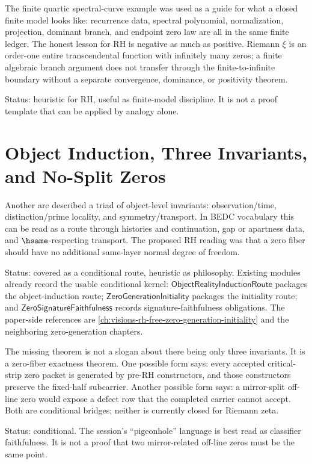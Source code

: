 The finite quartic spectral-curve example was used as a guide for what a
closed finite model looks like: recurrence data, spectral polynomial,
normalization, projection, dominant branch, and endpoint zero law are all in
the same finite ledger.  The honest lesson for RH is negative as much as
positive.  Riemann $\xi$ is an order-one entire transcendental function with
infinitely many zeros; a finite algebraic branch argument does not transfer
through the finite-to-infinite boundary without a separate convergence,
dominance, or positivity theorem.

Status: heuristic for RH, useful as finite-model discipline.  It is not a
proof template that can be applied by analogy alone.

\section{Object Induction, Three Invariants, and No-Split Zeros}
\label{sec:rh-ledger-object-induction-three-invariants}

Another arc described a triad of object-level invariants:
observation/time, distinction/prime locality, and symmetry/transport.  In
BEDC vocabulary this can be read as a route through histories and
continuation, gap or apartness data, and $\hsame$-respecting transport.  The
proposed RH reading was that a zero fiber should have no additional
same-layer normal degree of freedom.

Status: covered as a conditional route, heuristic as philosophy.  Existing
modules already record the usable conditional kernel:
$\mathsf{ObjectRealityInductionRoute}$ packages the object-induction route;
$\mathsf{ZeroGenerationInitiality}$ packages the initiality route; and
$\mathsf{ZeroSignatureFaithfulness}$ records signature-faithfulness
obligations.  The paper-side references are
\autoref{ch:visions-rh-free-zero-generation-initiality} and the neighboring
zero-generation chapters.

The missing theorem is not a slogan about there being only three
invariants.  It is a zero-fiber exactness theorem.  One possible form says:
every accepted critical-strip zero packet is generated by pre-RH
constructors, and those constructors preserve the fixed-half subcarrier.
Another possible form says: a mirror-split off-line zero would expose a
defect row that the completed carrier cannot accept.  Both are conditional
bridges; neither is currently closed for Riemann zeta.

Status: conditional.  The session's ``pigeonhole'' language is best read as
classifier faithfulness.  It is not a proof that two mirror-related off-line
zeros must be the same point.

